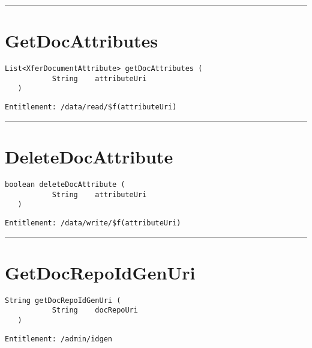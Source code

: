 \rule{12cm}{2pt}
\section{GetDocAttributes}
\label{Api:GetDocAttributes}
\begin{lstlisting}[style=nonumbers]
   List<XferDocumentAttribute> getDocAttributes (
           String    attributeUri
   )
\end{lstlisting}
\begin{Verbatim}[formatcom=\color{Maroon}]
  Entitlement: /data/read/$f(attributeUri)
\end{Verbatim}



\rule{12cm}{2pt}
\section{DeleteDocAttribute}
\label{Api:DeleteDocAttribute}
\begin{lstlisting}[style=nonumbers]
   boolean deleteDocAttribute (
           String    attributeUri
   )
\end{lstlisting}
\begin{Verbatim}[formatcom=\color{Maroon}]
  Entitlement: /data/write/$f(attributeUri)
\end{Verbatim}



\rule{12cm}{2pt}
\section{GetDocRepoIdGenUri}
\label{Api:GetDocRepoIdGenUri}
\begin{lstlisting}[style=nonumbers]
   String getDocRepoIdGenUri (
           String    docRepoUri
   )
\end{lstlisting}
\begin{Verbatim}[formatcom=\color{Maroon}]
  Entitlement: /admin/idgen
\end{Verbatim}



